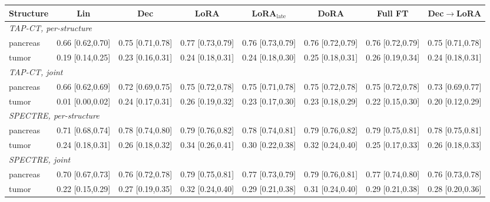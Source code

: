 \begin{tabular}{lccccccc}
\toprule
Structure & Lin & Dec & LoRA & LoRA$_{\text{late}}$ & DoRA & Full FT & Dec$\to$LoRA \\
\midrule
\multicolumn{8}{l}{\textit{TAP-CT, per-structure}} \\
pancreas & 0.66 [0.62,0.70] & 0.75 [0.71,0.78] & 0.77 [0.73,0.79] & 0.76 [0.73,0.79] & 0.76 [0.72,0.79] & 0.76 [0.72,0.79] & 0.75 [0.71,0.78] \\
tumor & 0.19 [0.14,0.25] & 0.23 [0.16,0.31] & 0.24 [0.18,0.31] & 0.24 [0.18,0.30] & 0.25 [0.18,0.31] & 0.26 [0.19,0.34] & 0.24 [0.18,0.31] \\
\multicolumn{8}{l}{\textit{TAP-CT, joint}} \\
pancreas & 0.66 [0.62,0.69] & 0.72 [0.69,0.75] & 0.75 [0.72,0.78] & 0.75 [0.71,0.78] & 0.75 [0.72,0.78] & 0.75 [0.72,0.78] & 0.73 [0.69,0.77] \\
tumor & 0.01 [0.00,0.02] & 0.24 [0.17,0.31] & 0.26 [0.19,0.32] & 0.23 [0.17,0.30] & 0.23 [0.18,0.29] & 0.22 [0.15,0.30] & 0.20 [0.12,0.29] \\
\multicolumn{8}{l}{\textit{SPECTRE, per-structure}} \\
pancreas & 0.71 [0.68,0.74] & 0.78 [0.74,0.80] & 0.79 [0.76,0.82] & 0.78 [0.74,0.81] & 0.79 [0.76,0.82] & 0.79 [0.75,0.81] & 0.78 [0.75,0.81] \\
tumor & 0.24 [0.18,0.31] & 0.26 [0.18,0.32] & 0.34 [0.26,0.41] & 0.30 [0.22,0.38] & 0.32 [0.24,0.40] & 0.25 [0.17,0.33] & 0.26 [0.18,0.33] \\
\multicolumn{8}{l}{\textit{SPECTRE, joint}} \\
pancreas & 0.70 [0.67,0.73] & 0.76 [0.72,0.78] & 0.79 [0.75,0.81] & 0.77 [0.73,0.79] & 0.79 [0.76,0.81] & 0.77 [0.74,0.80] & 0.76 [0.73,0.78] \\
tumor & 0.22 [0.15,0.29] & 0.27 [0.19,0.35] & 0.32 [0.24,0.40] & 0.29 [0.21,0.38] & 0.31 [0.24,0.40] & 0.29 [0.21,0.38] & 0.28 [0.20,0.36] \\
\bottomrule
\end{tabular}
